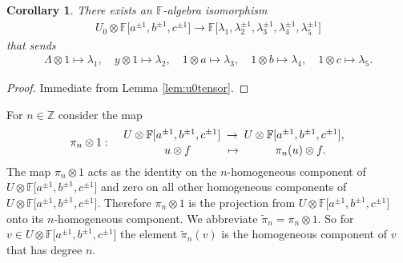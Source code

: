 \documentclass[11pt]{article}
\numberwithin{equation}{section}
\newtheorem{Corollary}[Theorem]{Corollary}
\begin{document}
\begin{Corollary}
\label{cor:polyalg}
There exists an $\mathbb F$-algebra isomorphism
\begin{gather*}
U_0 \otimes
\mathbb F \big\lbrack a^{\pm 1}, b^{\pm 1}, c^{\pm 1}\big\rbrack  \to
\mathbb F\big\lbrack \lambda_1,
\lambda_2^{\pm 1},
\lambda_3^{\pm 1},
\lambda_4^{\pm 1},
\lambda_5^{\pm 1} \big\rbrack
\end{gather*}
that sends
\begin{gather*}
\Lambda \otimes 1 \mapsto \lambda_1, \quad
y\otimes 1 \mapsto \lambda_2 ,\quad
1\otimes a \mapsto \lambda_3,
\quad
1\otimes b \mapsto \lambda_4,
\quad
1\otimes c \mapsto \lambda_5.
\end{gather*}
\end{Corollary}
\begin{proof}
Immediate from
Lemma
\ref{lem:u0tensor}.
\end{proof}

\begin{Definition}
\label{def:tildeproj}
\rm For $n \in \mathbb Z$  consider the
map
\begin{gather*}
\pi_n \otimes 1: \quad
\genfrac{}{}{0pt}{}{
U \otimes
\mathbb F \lbrack a^{\pm 1}, b^{\pm 1}, c^{\pm 1}\rbrack \; \to\;
U\otimes
\mathbb F \lbrack a^{\pm 1}, b^{\pm 1}, c^{\pm 1}\rbrack,
}
{\qquad  u \otimes f  \quad \qquad
\mapsto
\qquad \quad
\pi_n(u)\otimes f.}
\end{gather*}
The map
$\pi_n \otimes 1$
acts as the identity on the $n$-homogeneous component of
$U\otimes
\mathbb F \lbrack a^{\pm 1}, b^{\pm 1}, c^{\pm 1}\rbrack$
and  zero on all  other homogeneous components of
$U \otimes
\mathbb F \lbrack a^{\pm 1}, b^{\pm 1}, c^{\pm 1}\rbrack$.
Therefore
$\pi_n \otimes 1$ is the
projection from
$U\otimes
\mathbb F \lbrack a^{\pm 1}, b^{\pm 1}, c^{\pm 1}\rbrack$
onto its $n$-homogeneous component.
We abbreviate
$\tilde \pi_n =
\pi_n \otimes 1$.
So for $v \in
U \otimes
\mathbb F \lbrack a^{\pm 1}, b^{\pm 1}, c^{\pm 1}\rbrack$
the element
$\tilde \pi_n(v)$ is the homogeneous component of
$v$ that has degree $n$.
\end{Definition}
\end{document}
